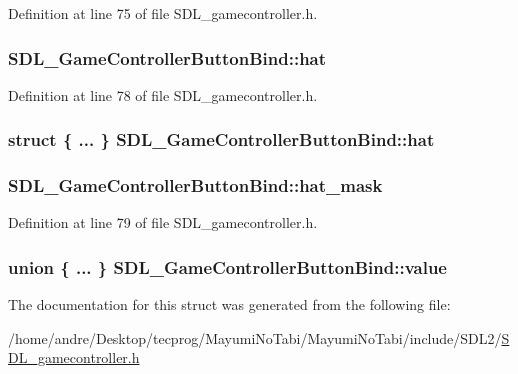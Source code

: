 Definition at line 75 of file S\-D\-L\-\_\-gamecontroller.\-h.

\hypertarget{struct_s_d_l___game_controller_button_bind_aa71f0e94721b28ee35aec0d1ac1c200e}{
\subsubsection[{hat}]{ S\-D\-L\-\_\-\-Game\-Controller\-Button\-Bind\-::hat}}\label{struct_s_d_l___game_controller_button_bind_aa71f0e94721b28ee35aec0d1ac1c200e}


Definition at line 78 of file S\-D\-L\-\_\-gamecontroller.\-h.

\hypertarget{struct_s_d_l___game_controller_button_bind_a0191ea1ae377e147b81dfee93156d2f2}{
\subsubsection[{hat}]{\setlength{\rightskip}{0pt plus 5cm}struct \{ ... \}   S\-D\-L\-\_\-\-Game\-Controller\-Button\-Bind\-::hat}}\label{struct_s_d_l___game_controller_button_bind_a0191ea1ae377e147b81dfee93156d2f2}
\hypertarget{struct_s_d_l___game_controller_button_bind_a9f1197eb0a12d824946d59ee6c4a2999}{
\subsubsection[{hat\-\_\-mask}]{ S\-D\-L\-\_\-\-Game\-Controller\-Button\-Bind\-::hat\-\_\-mask}}\label{struct_s_d_l___game_controller_button_bind_a9f1197eb0a12d824946d59ee6c4a2999}


Definition at line 79 of file S\-D\-L\-\_\-gamecontroller.\-h.

\hypertarget{struct_s_d_l___game_controller_button_bind_a617787596bd34e89e7619a585cab0c94}{
\subsubsection[{value}]{\setlength{\rightskip}{0pt plus 5cm}union \{ ... \}   S\-D\-L\-\_\-\-Game\-Controller\-Button\-Bind\-::value}}\label{struct_s_d_l___game_controller_button_bind_a617787596bd34e89e7619a585cab0c94}


The documentation for this struct was generated from the following file\-:\begin{DoxyCompactItemize}
\item 
/home/andre/\-Desktop/tecprog/\-Mayumi\-No\-Tabi/\-Mayumi\-No\-Tabi/include/\-S\-D\-L2/\hyperlink{_s_d_l__gamecontroller_8h}{S\-D\-L\-\_\-gamecontroller.\-h}\end{DoxyCompactItemize}
